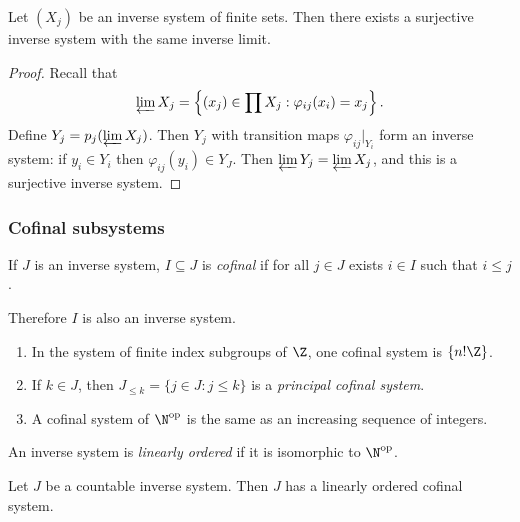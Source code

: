 \documentclass[a4paper]{article}
\begin{document}
\begin{proposition}
  Let \((X_j)\) be an inverse system of finite sets. Then there exists a surjective inverse system with the same inverse limit.
\end{proposition}

\begin{proof}
  Recall that
  \[
    \varprojlim X_j = \left\{ (x_j) \in \prod X_j: \varphi_{ij}(x_i) = x_j \right\}.
  \]
  Define \(Y_j = p_j(\varprojlim X_j)\). Then \(Y_j\) with transition maps \(\varphi_{ij}|_{Y_i}\) form an inverse system: if \(y_i \in Y_i\) then \(\varphi_{ij}(y_i) \in Y_J\). Then \(\varprojlim Y_j = \varprojlim X_j\), and this is a surjective inverse system.
\end{proof}

\subsubsection{Cofinal subsystems}

\begin{definition}[cofinal]
  If \(J\) is an inverse system, \(I \subseteq J\) is \emph{cofinal} if for all \(j \in J\) exists \(i \in I\) such that \(i \leq j\).
\end{definition}
Therefore \(I\) is also an inverse system.

\begin{eg}\leavevmode
  \begin{enumerate}
  \item In the system of finite index subgroups of \(\Z\), one cofinal system is \(\{n! \Z\}\).
  \item If \(k \in J\), then \(J_{\leq k} = \{j \in J: j \leq k\}\) is a \emph{principal cofinal system}.
  \item A cofinal system of \(\N^{\text{op}}\) is the same as an increasing sequence of integers.
  \end{enumerate}
\end{eg}

\begin{definition}
  An inverse system is \emph{linearly ordered} if it is isomorphic to \(\N^{\text{op}}\).
\end{definition}

\begin{proposition}
  Let \(J\) be a countable inverse system. Then \(J\) has a linearly ordered cofinal system.
\end{proposition}
\end{document}
